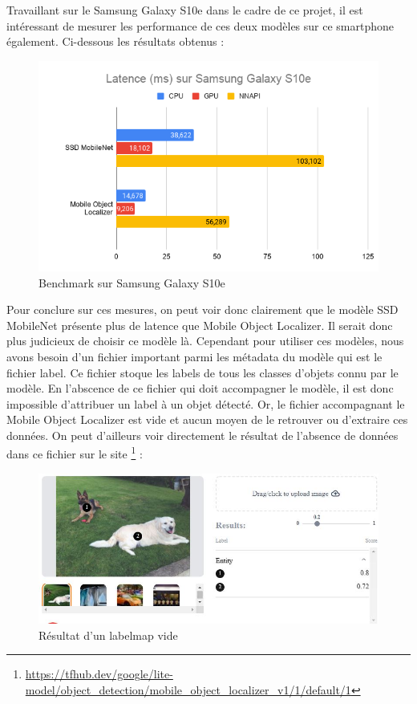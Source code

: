 \documentclass[UTF8]{EPURapport}
\begin{document}
Travaillant sur le Samsung Galaxy S10e dans le cadre de ce projet, il est intéressant de mesurer les performance de ces deux modèles sur ce smartphone également. Ci-dessous les résultats obtenus :

\begin{figure}[h!]
\centering
  \includegraphics[width=\textwidth]{images/bench_s10e.png}
  \caption{Benchmark sur Samsung Galaxy S10e}
  \label{fig:benchs10e}
\end{figure}

Pour conclure sur ces mesures, on peut voir donc clairement que le modèle SSD MobileNet présente plus de latence que Mobile Object Localizer. Il serait donc plus judicieux de choisir ce modèle là. Cependant pour utiliser ces modèles, nous avons besoin d'un fichier important parmi les métadata du modèle qui est le fichier label. Ce fichier stoque les labels de tous les classes d'objets connu par le modèle. En l'abscence de ce fichier qui doit accompagner le modèle, il est donc impossible d'attribuer un label à un objet détecté. Or, le fichier accompagnant le Mobile Object Localizer est vide et aucun moyen de le retrouver ou d'extraire ces données.  On peut d'ailleurs voir directement le résultat de l'absence de données dans ce fichier sur le site \footnote{\url{https://tfhub.dev/google/lite-model/object_detection/mobile_object_localizer_v1/1/default/1}} :

\begin{figure}[h!]
\centering
  \includegraphics[width=\textwidth]{images/labels_empty.JPG}
  \caption{Résultat d'un labelmap vide}
  \label{fig:labelsempty}
\end{figure}
\end{document}
